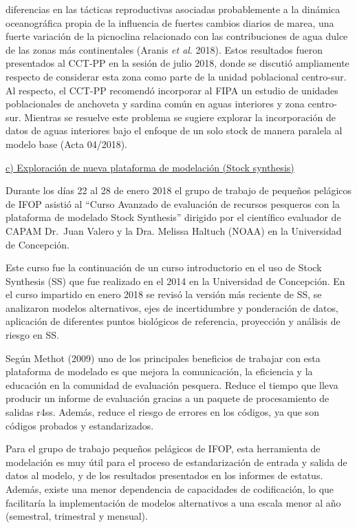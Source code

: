 \documentclass[
  spanish,
]{article}
\begin{document}
diferencias en las tácticas reproductivas asociadas probablemente a la
dinámica oceanográfica propia de la influencia de fuertes cambios
diarios de marea, una fuerte variación de la picnoclina relacionado con
las contribuciones de agua dulce de las zonas más continentales (Aranis
\emph{et al}. 2018). Estos resultados fueron presentados al CCT-PP en la
sesión de julio 2018, donde se discutió ampliamente respecto de
considerar esta zona como parte de la unidad poblacional centro-sur. Al
respecto, el CCT-PP recomendó incorporar al FIPA un estudio de unidades
poblacionales de anchoveta y sardina común en aguas interiores y zona
centro-sur. Mientras se resuelve este problema se sugiere explorar la
incorporación de datos de aguas interiores bajo el enfoque de un solo
stock de manera paralela al modelo base (Acta 04/2018).

\vspace{0.3cm}

\underline{c) Exploración de nueva plataforma de modelación (Stock synthesis)}

Durante los días 22 al 28 de enero 2018 el grupo de trabajo de pequeños
pelágicos de IFOP asistió al ``Curso Avanzado de evaluación de recursos
pesqueros con la plataforma de modelado Stock Synthesis'' dirigido por
el científico evaluador de CAPAM Dr.~Juan Valero y la Dra. Melissa
Haltuch (NOAA) en la Universidad de Concepción.

Este curso fue la continuación de un curso introductorio en el uso de
Stock Synthesis (SS) que fue realizado en el 2014 en la Universidad de
Concepción. En el curso impartido en enero 2018 se revisó la versión más
reciente de SS, se analizaron modelos alternativos, ejes de
incertidumbre y ponderación de datos, aplicación de diferentes puntos
biológicos de referencia, proyección y análisis de riesgo en SS.

Según Methot (2009) uno de los principales beneficios de trabajar con
esta plataforma de modelado es que mejora la comunicación, la eficiencia
y la educación en la comunidad de evaluación pesquera. Reduce el tiempo
que lleva producir un informe de evaluación gracias a un paquete de
procesamiento de salidas r4ss. Además, reduce el riesgo de errores en
los códigos, ya que son códigos probados y estandarizados.

Para el grupo de trabajo pequeños pelágicos de IFOP, esta herramienta de
modelación es muy útil para el proceso de estandarización de entrada y
salida de datos al modelo, y de los resultados presentados en los
informes de estatus. Además, existe una menor dependencia de capacidades
de codificación, lo que facilitaría la implementación de modelos
alternativos a una escala menor al año (semestral, trimestral y
mensual).
\end{document}
